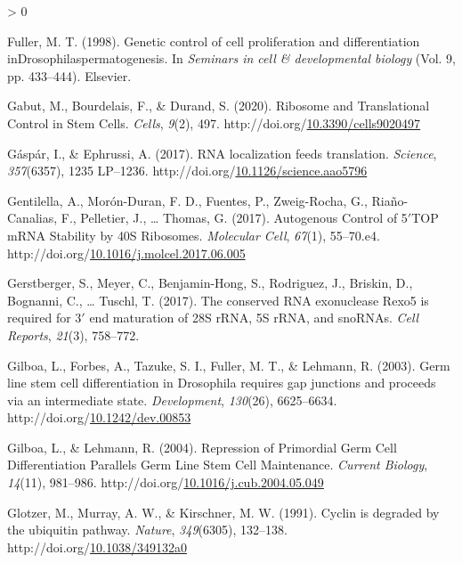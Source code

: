 \documentclass[12pt,oneside]{reedthesis}
\newlength{\cslhangindent}
\newenvironment{CSLReferences}[2] %
 {%
  \setlength{\parindent}{0pt}
  \ifodd #1 \everypar{\setlength{\hangindent}{\cslhangindent}}\ignorespaces\fi
  \ifnum #2 > 0
  \setlength{\parskip}{#2\baselineskip}
  \fi
 }%
 {}
\begin{document}
\begin{CSLReferences}{1}{0}
\leavevmode\hypertarget{ref-Fuller1998c}{}%
Fuller, M. T. (1998). Genetic control of cell proliferation and differentiation {inDrosophilaspermatogenesis}. In \emph{Seminars in cell \& developmental biology} (Vol. 9, pp. 433--444). {Elsevier}.

\leavevmode\hypertarget{ref-gabutRibosomeTranslationalControl2020}{}%
Gabut, M., Bourdelais, F., \& Durand, S. (2020). Ribosome and {Translational Control} in {Stem Cells}. \emph{Cells}, \emph{9}(2), 497. http://doi.org/\href{https://doi.org/10.3390/cells9020497}{10.3390/cells9020497}

\leavevmode\hypertarget{ref-Gaspar2017b}{}%
Gáspár, I., \& Ephrussi, A. (2017). {RNA} localization feeds translation. \emph{Science}, \emph{357}(6357), 1235 LP--1236. http://doi.org/\href{https://doi.org/10.1126/science.aao5796}{10.1126/science.aao5796}

\leavevmode\hypertarget{ref-gentilellaAutogenousControlTOP2017}{}%
Gentilella, A., Morón-Duran, F. D., Fuentes, P., Zweig-Rocha, G., Riaño-Canalias, F., Pelletier, J., \ldots{} Thomas, G. (2017). Autogenous {Control} of 5{\({'}\)}{TOP mRNA Stability} by {40S Ribosomes}. \emph{Molecular Cell}, \emph{67}(1), 55--70.e4. http://doi.org/\href{https://doi.org/10.1016/j.molcel.2017.06.005}{10.1016/j.molcel.2017.06.005}

\leavevmode\hypertarget{ref-Gerstberger2017}{}%
Gerstberger, S., Meyer, C., Benjamin-Hong, S., Rodriguez, J., Briskin, D., Bognanni, C., \ldots{} Tuschl, T. (2017). The conserved {RNA} exonuclease {Rexo5} is required for 3{\({'}\)} end maturation of {28S rRNA}, {5S rRNA}, and {snoRNAs}. \emph{Cell Reports}, \emph{21}(3), 758--772.

\leavevmode\hypertarget{ref-gilboaGermLineStem2003}{}%
Gilboa, L., Forbes, A., Tazuke, S. I., Fuller, M. T., \& Lehmann, R. (2003). Germ line stem cell differentiation in {Drosophila} requires gap junctions and proceeds via an intermediate state. \emph{Development}, \emph{130}(26), 6625--6634. http://doi.org/\href{https://doi.org/10.1242/dev.00853}{10.1242/dev.00853}

\leavevmode\hypertarget{ref-Gilboa2004a}{}%
Gilboa, L., \& Lehmann, R. (2004). Repression of {Primordial Germ Cell Differentiation Parallels Germ Line Stem Cell Maintenance}. \emph{Current Biology}, \emph{14}(11), 981--986. http://doi.org/\href{https://doi.org/10.1016/j.cub.2004.05.049}{10.1016/j.cub.2004.05.049}

\leavevmode\hypertarget{ref-glotzerCyclinDegradedUbiquitin1991}{}%
Glotzer, M., Murray, A. W., \& Kirschner, M. W. (1991). Cyclin is degraded by the ubiquitin pathway. \emph{Nature}, \emph{349}(6305), 132--138. http://doi.org/\href{https://doi.org/10.1038/349132a0}{10.1038/349132a0}


\end{CSLReferences}
\end{document}
